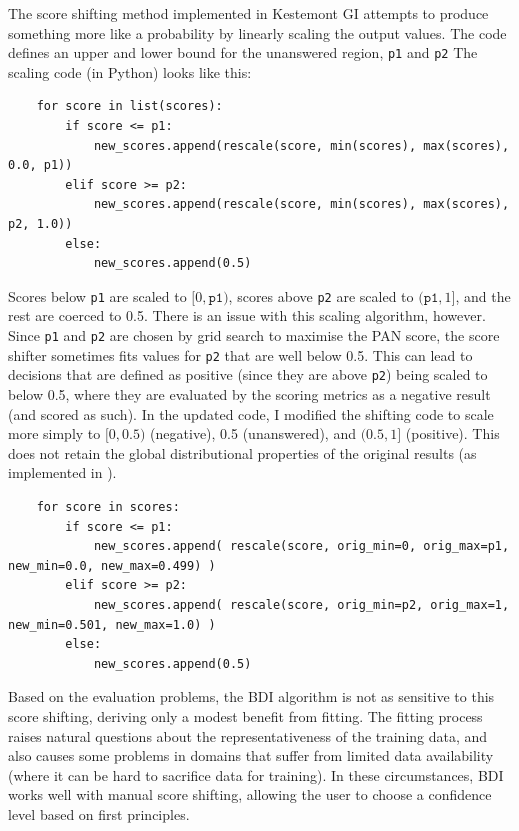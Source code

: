 \documentclass[
    hf
]{ceurart}
\begin{document}
The score shifting method implemented in Kestemont GI attempts to produce something more like a
probability by linearly scaling the output values. The code defines an upper and lower bound for the
unanswered region, \texttt{p1} and \texttt{p2} The scaling code (in Python) looks like this:

\begin{verbatim}
    for score in list(scores):
        if score <= p1:
            new_scores.append(rescale(score, min(scores), max(scores), 0.0, p1))
        elif score >= p2:
            new_scores.append(rescale(score, min(scores), max(scores), p2, 1.0))
        else:
            new_scores.append(0.5)
\end{verbatim}

Scores below \texttt{p1} are scaled to $[0,\texttt{p1})$, scores above \texttt{p2} are scaled to
            $(\texttt{p1},1]$, and the rest are coerced to 0.5. There is an issue with this scaling algorithm,
however. Since \texttt{p1} and \texttt{p2} are chosen by grid search to maximise the PAN score, the
score shifter sometimes fits values for \texttt{p2} that are well below 0.5. This can lead to
decisions that are defined as positive (since they are above \texttt{p2}) being scaled to below 0.5,
where they are evaluated by the scoring metrics as a negative result (and scored as such). In the
updated code, I modified the shifting code to scale more simply to $[0,0.5)$ (negative), 0.5
                (unanswered), and $(0.5,1]$ (positive). This does not retain the global distributional properties of
the original results (as implemented in \cite{kestemont_caesar}).

\begin{verbatim}
    for score in scores: 
        if score <= p1: 
            new_scores.append( rescale(score, orig_min=0, orig_max=p1, new_min=0.0, new_max=0.499) ) 
        elif score >= p2: 
            new_scores.append( rescale(score, orig_min=p2, orig_max=1, new_min=0.501, new_max=1.0) )
        else: 
            new_scores.append(0.5)
\end{verbatim}

Based on the evaluation problems, the BDI algorithm is not as sensitive to this score shifting,
deriving only a modest benefit from fitting. The fitting process raises natural questions about the
representativeness of the training data, and also causes some problems in domains that suffer from
limited data availability (where it can be hard to sacrifice data for training). In these
circumstances, BDI works well with manual score shifting, allowing the user to choose a confidence
level based on first principles.
\end{document}
